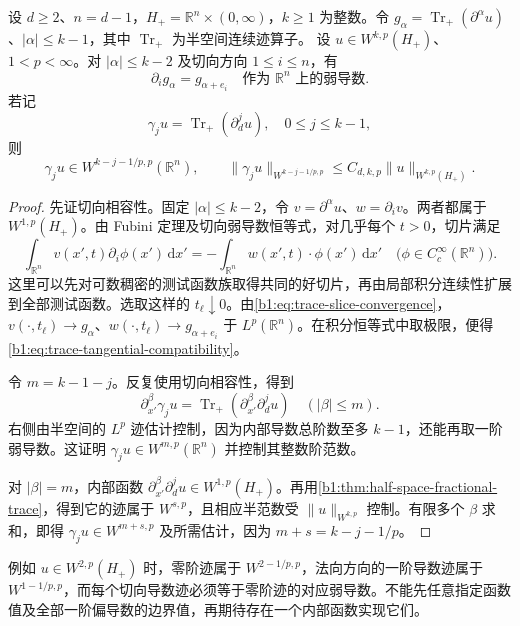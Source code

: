 \begin{proposition}[平坦边界的高阶迹]\label{b1:prop:flat-higher-traces}
设 \(d\geq2\)、\(n=d-1\)，\(H_+=\mathbb R^n\times(0,\infty)\)，\(k\geq1\) 为整数。令 \(g_\alpha=\operatorname{Tr}_+(\partial^\alpha u)\)、\(|\alpha|\leq k-1\)，其中 \(\operatorname{Tr}_+\) 为半空间连续迹算子。
设 \(u\in W^{k,p}(H_+)\)、\(1<p<\infty\)。对 \(|\alpha|\le k-2\) 及切向方向 \(1\le i\le n\)，有
\begin{equation}\label{b1:eq:trace-tangential-compatibility}
 \partial_i g_\alpha=g_{\alpha+e_i}
 \quad\text{作为 }\mathbb R^n\text{ 上的弱导数}.
\end{equation}
若记
\[
 \gamma_j u=\operatorname{Tr}_+(\partial_d^j u),
 \quad 0\le j\le k-1,
\]
则
\begin{equation}\label{b1:eq:higher-flat-trace-bound}
 \gamma_j u\in W^{k-j-1/p,p}(\mathbb R^n),\qquad
 \|\gamma_j u\|_{W^{k-j-1/p,p}}
 \le C_{d,k,p}\|u\|_{W^{k,p}(H_+)}.
\end{equation}
\end{proposition}
\begin{proof}
先证切向相容性。固定 \(|\alpha|\le k-2\)，令 \(v=\partial^\alpha u\)、\(w=\partial_i v\)。两者都属于 \(W^{1,p}(H_+)\)。由 Fubini 定理及切向弱导数恒等式，对几乎每个 \(t>0\)，切片满足
\[
 \int_{\mathbb R^n}v(x',t)\partial_i\phi(x')\,\mathrm dx'
 =-\int_{\mathbb R^n}w(x',t)\cdot\phi(x')\,\mathrm dx'
 \quad\bigl(\phi\in C_c^\infty(\mathbb R^n)\bigr).
\]
这里可以先对可数稠密的测试函数族取得共同的好切片，再由局部积分连续性扩展到全部测试函数。选取这样的 \(t_\ell\downarrow0\)。由\eqref{b1:eq:trace-slice-convergence}，\(v(\cdot,t_\ell)\to g_\alpha\)、\(w(\cdot,t_\ell)\to g_{\alpha+e_i}\) 于 \(L^p(\mathbb R^n)\)。在积分恒等式中取极限，便得\eqref{b1:eq:trace-tangential-compatibility}。

令 \(m=k-1-j\)。反复使用切向相容性，得到
\[
 \partial_{x'}^\beta\gamma_j u
 =\operatorname{Tr}_+
       (\partial_{x'}^\beta\partial_d^j u)
 \quad(|\beta|\le m).
\]
右侧由半空间的 \(L^p\) 迹估计控制，因为内部导数总阶数至多 \(k-1\)，还能再取一阶弱导数。这证明 \(\gamma_ju\in W^{m,p}(\mathbb R^n)\) 并控制其整数阶范数。

对 \(|\beta|=m\)，内部函数
\(\partial_{x'}^\beta\partial_d^j u\in W^{1,p}(H_+)\)。再用\cref{b1:thm:half-space-fractional-trace}，得到它的迹属于 \(W^{s,p}\)，且相应半范数受 \(\|u\|_{W^{k,p}}\) 控制。有限多个 \(\beta\) 求和，即得 \(\gamma_ju\in W^{m+s,p}\) 及所需估计，因为 \(m+s=k-j-1/p\)。
\end{proof}

例如 \(u\in W^{2,p}(H_+)\) 时，零阶迹属于 \(W^{2-1/p,p}\)，法向方向的一阶导数迹属于 \(W^{1-1/p,p}\)，而每个切向导数迹必须等于零阶迹的对应弱导数。不能先任意指定函数值及全部一阶偏导数的边界值，再期待存在一个内部函数实现它们。

